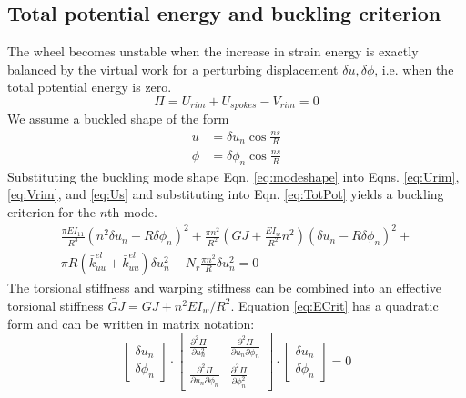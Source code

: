 \documentclass{bmd2016p}
\begin{document}
\subsection{Total potential energy and buckling criterion}
The wheel becomes unstable when the increase in strain energy is exactly balanced by the virtual work for a perturbing displacement $\delta u, \delta\phi$, i.e. when the total potential energy is zero.
	\begin{equation}\label{eq:TotPot}
	\Pi = U_{rim} + U_{spokes} - V_{rim} = 0
	\end{equation}
We assume a buckled shape of the form
	\begin{equation}\label{eq:modeshape}
	\begin{split}
	u &= \delta u_n \cos{\frac{ns}{R}} \\
	\phi &= \delta\phi_n \cos{\frac{ns}{R}}
	\end{split}
	\end{equation}
Substituting the buckling mode shape Eqn. \ref{eq:modeshape} into Eqns. \ref{eq:Urim}, \ref{eq:Vrim}, and \ref{eq:Us} and substituting into Eqn. \ref{eq:TotPot} yields a buckling criterion for the $n$th mode.
	\begin{multline}\label{eq:ECrit}
	\frac{\pi EI_{11}}{R^3}(n^2 \delta u_n - R\delta\phi_n)^2 + \frac{\pi n^2}{R^2}\left(GJ + \frac{EI_w}{R^2}n^2\right)(\delta u_n-R\delta\phi_n)^2 + \\
	\pi R(\bar{k}_{uu}^{el} + \bar{k}_{uu}^{el})\delta u_n^2 - N_r\frac{\pi n^2}{R}\delta u_n^2=0
	\end{multline}
The torsional stiffness and warping stiffness can be combined into an effective torsional stiffness $\widetilde{GJ} = GJ + n^2EI_w/R^2$. Equation \ref{eq:ECrit} has a quadratic form and can be written in matrix notation:
	\begin{equation}\label{eq:Qform}
	\begin{bmatrix}
	\delta u_n\\\delta\phi_n
	\end{bmatrix} \cdot
	\begin{bmatrix}
	\frac{\partial^2 \Pi}{\partial u_n^2} & \frac{\partial^2 \Pi}{\partial u_n \partial \phi_n}\\
	\frac{\partial^2 \Pi}{\partial u_n\partial\phi_n} & \frac{\partial^2 \Pi}{\partial \phi_n^2}
	\end{bmatrix} \cdot
	\begin{bmatrix}
	\delta u_n\\\delta\phi_n
	\end{bmatrix}
	=0
	\end{equation}
\end{document}
